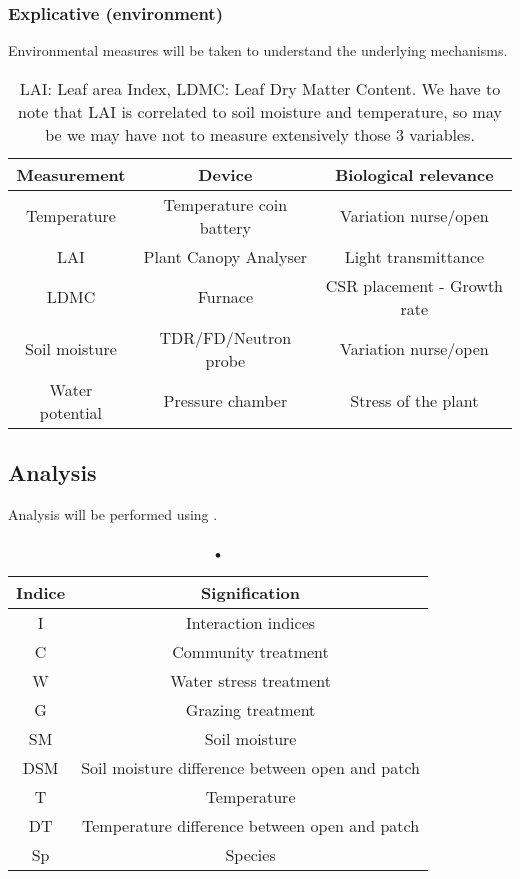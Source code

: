 \documentclass[12pt]{article} %
\begin{document}
\subsubsection{Explicative (environment)}
Environmental measures will be taken to understand the underlying mechanisms.
\begin{table}[h]
\begin{center}
\begin{tabular}{ccc}
Measurement & Device & Biological relevance\\
\hline
Temperature & Temperature coin battery & Variation nurse/open\\
LAI & Plant Canopy Analyser & Light transmittance\\
LDMC & Furnace & CSR placement - Growth rate\\
Soil moisture & TDR/FD/Neutron probe & Variation nurse/open\\
Water potential & Pressure chamber & Stress of the plant\\
\hline 
\end{tabular}
\caption{LAI: Leaf area Index, LDMC: Leaf Dry Matter Content. We have to note that LAI is correlated to soil moisture and temperature, so may be we may have not to measure extensively those 3 variables.}
\end{center}
\end{table}


\subsection{Analysis}

Analysis will be performed using \citep{RCoreTeam2015}.
\begin{table}[h]
\begin{center}
\begin{tabular}{cc}
Indice & Signification\\
\hline
I & Interaction indices\\
C & Community treatment\\
W & Water stress treatment\\
G & Grazing treatment\\
SM & Soil moisture\\
DSM & Soil moisture difference between open and patch\\
T & Temperature \\
DT & Temperature difference between open and patch \\
Sp & Species \\
\hline 
\end{tabular}
\caption{•}
\end{center}
\end{table}
\end{document}
